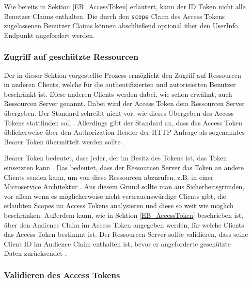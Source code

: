 Wie bereits in Sektion \ref{EB_AccessToken} erläutert, kann der ID Token nicht alle Benutzer Claims enthalten. Die durch den \texttt{scope} Claim des Access Tokens zugelassenen Benutzer Claims können abschließend optional über den UserInfo Endpunkt angefordert werden.


\subsubsection{Zugriff auf geschützte Ressourcen} \label{EB_Zugriff auf geschützte Ressourcen}

Der in dieser Sektion vorgestellte Prozess ermöglicht den Zugriff auf Ressourcen in anderen Clients, welche für die authentifizierten und autorisierten Benutzer beschränkt ist. Diese anderen Clients werden dabei, wie schon erwähnt, auch Ressourcen Server genannt. Dabei wird der Access Token dem Ressourcen Server übergeben. Der Standard schreibt nicht vor, wie dieses Übergeben des Access Tokens stattfinden soll \cite[Sec. 7]{RFC6749}. Allerdings gibt der Standard an, dass das Access Token üblicherweise über den Authorization Header der HTTP Anfrage als sogenanntes Bearer Token übermittelt werden sollte \cite[Sec. 7]{RFC6749}. 

Bearer Token bedeutet, dass jeder, der im Besitz des Tokens ist, das Token einsetzten kann \cite[Sec. 1.2]{RFC6750}. Das bedeutet, dass der Ressourcen Server das Token an andere Clients senden kann, um von diese Ressourcen abzurufen, z.B. in einer Microservice Architektur \cite{EB31}. Aus diesem Grund sollte man aus Sicherheitsgründen, vor allem wenn es möglicherweise nicht vertrauenswürdige Clients gibt, die erlaubten Scopes im Access Tokens analysieren und diese so weit wie möglich beschränken. Außerdem kann, wie in Sektion \ref{EB_AccessToken} beschrieben ist, über den Audience Claim im Access Token angegeben werden, für welche Clients das Access Token bestimmt ist. Der Ressourcen Server sollte validieren, dass seine Client ID im Audience Claim enthalten ist, bevor er angeforderte geschützte Daten zurücksendet \cite[Audience Support]{keycloakDocs}.

\subsubsection{Validieren des Access Tokens} \label{Validieren des Access Tokens}

